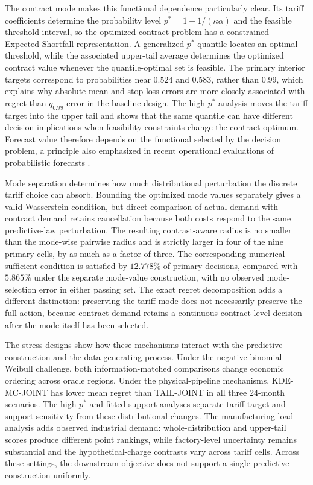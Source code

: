 \documentclass[Times1COL]{WileyNJDv5}
\begin{document}
The contract mode makes this functional dependence particularly clear.
Its tariff coefficients determine the probability level
$p^\ast=1-1/(\kappa\alpha)$ and the feasible threshold interval, so the
optimized contract problem has a constrained Expected-Shortfall
representation. A generalized $p^\ast$-quantile locates an optimal
threshold, while the associated upper-tail average determines the
optimized contract value whenever the quantile-optimal set is feasible.
The primary interior targets correspond to probabilities near $0.524$
and $0.583$, rather than $0.99$, which explains why absolute mean and
stop-loss errors are more closely associated with regret than
$q_{0.99}$ error in the baseline design. The high-$p^\ast$ analysis
moves the tariff target into the upper tail and shows that the same
quantile can have different decision implications when feasibility
constraints change the contract optimum. Forecast value therefore
depends on the functional selected by the decision problem, a principle
also emphasized in recent operational evaluations of probabilistic
forecasts \cite{WangEtAl2023,BeykirchEtAl2024}.

Mode separation determines how much distributional perturbation the
discrete tariff choice can absorb. Bounding the optimized mode values
separately gives a valid Wasserstein condition, but direct comparison
of actual demand with contract demand retains cancellation because both
costs respond to the same predictive-law perturbation. The resulting
contrast-aware radius is no smaller than the mode-wise pairwise radius
and is strictly larger in four of the nine primary cells, by as much as
a factor of three. The corresponding numerical sufficient condition is
satisfied by $12.778\%$ of primary decisions, compared with $5.865\%$
under the separate mode-value construction, with no observed
mode-selection error in either passing set. The exact regret
decomposition adds a different distinction: preserving the tariff mode
does not necessarily preserve the full action, because contract demand
retains a continuous contract-level decision after the mode itself has
been selected.

The stress designs show how these mechanisms interact with the
predictive construction and the data-generating process. Under the
negative-binomial--Weibull challenge, both information-matched
comparisons change economic ordering across oracle regions. Under the
physical-pipeline mechanisms, KDE-MC-JOINT has lower mean regret than
TAIL-JOINT in all three 24-month scenarios. The high-$p^\ast$ and
fitted-support analyses separate tariff-target and support sensitivity
from these distributional changes. The manufacturing-load analysis
adds observed industrial demand: whole-distribution and upper-tail
scores produce different point rankings, while factory-level
uncertainty remains substantial and the hypothetical-charge contrasts
vary across tariff cells. Across these settings, the downstream
objective does not support a single predictive construction uniformly.
\end{document}
